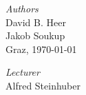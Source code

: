 \begin{titlepage}
\begin{center}
	\begin{minipage}{0.4\textwidth}
	    \begin{flushleft} \large
		\emph{Authors}\\
	        David B. Heer\\ 
	        Jakob  Soukup\\
		Graz, \today
	    \end{flushleft}
	\end{minipage}
	\hfill
	\begin{minipage}{0.4\textwidth}
	    \begin{flushright} \large
	        \emph{Lecturer} \\
	        Alfred Steinhuber \\ ~ \\
	    \end{flushright}
	\end{minipage}
	
	\end{center}

\end{titlepage}
